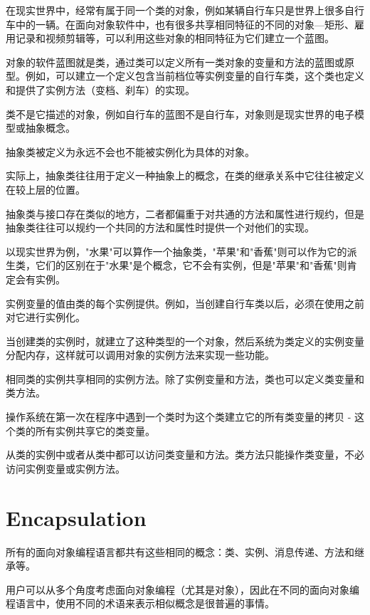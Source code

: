 在现实世界中，经常有属于同一个类的对象，例如某辆自行车只是世界上很多自行车中的一辆。在面向对象软件中，也有很多共享相同特征的不同的对象—矩形、雇用记录和视频剪辑等，可以利用这些对象的相同特征为它们建立一个蓝图。

对象的软件蓝图就是类，通过类可以定义所有一类对象的变量和方法的蓝图或原型。例如，可以建立一个定义包含当前档位等实例变量的自行车类，这个类也定义和提供了实例方法（变档、刹车）的实现。

\begin{compactitem}
\item 类不是它描述的对象，例如自行车的蓝图不是自行车，对象则是现实世界的电子模型或抽象概念。
\item 抽象类被定义为永远不会也不能被实例化为具体的对象。
\end{compactitem}

实际上，抽象类往往用于定义一种抽象上的概念，在类的继承关系中它往往被定义在较上层的位置。

抽象类与接口存在类似的地方，二者都偏重于对共通的方法和属性进行规约，但是抽象类往往可以规约一个共同的方法和属性时提供一个对他们的实现。

以现实世界为例，"水果"可以算作一个抽象类，"苹果"和"香蕉"则可以作为它的派生类，它们的区别在于"水果"是个概念，它不会有实例，但是"苹果"和"香蕉"则肯定会有实例。

实例变量的值由类的每个实例提供。例如，当创建自行车类以后，必须在使用之前对它进行实例化。



当创建类的实例时，就建立了这种类型的一个对象，然后系统为类定义的实例变量分配内存，这样就可以调用对象的实例方法来实现一些功能。

相同类的实例共享相同的实例方法。除了实例变量和方法，类也可以定义类变量和类方法。

操作系统在第一次在程序中遇到一个类时为这个类建立它的所有类变量的拷贝 - 这个类的所有实例共享它的类变量。


从类的实例中或者从类中都可以访问类变量和方法。类方法只能操作类变量，不必访问实例变量或实例方法。



\section{Encapsulation}

所有的面向对象编程语言都共有这些相同的概念：类、实例、消息传递、方法和继承等。


用户可以从多个角度考虑面向对象编程（尤其是对象），因此在不同的面向对象编程语言中，使用不同的术语来表示相似概念是很普遍的事情。

